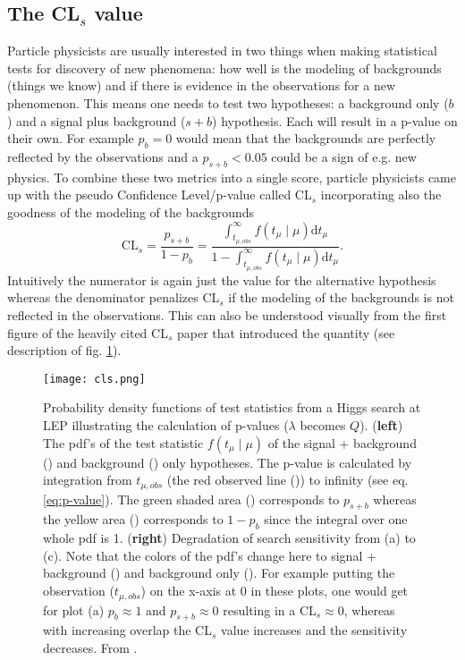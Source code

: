 \subsection{The CL$_s$ value}\label{sec:cls}

Particle physicists are usually interested in two things when making statistical tests for discovery of new phenomena: how well is the modeling of backgrounds (things we know) and if there is evidence in the observations for a new phenomenon. This means one needs to test two hypotheses: a background only ($b$) and a signal plus background ($s+b$) hypothesis. Each will result in a p-value on their own. For example $p_{b}=0$ would mean that the backgrounds are perfectly reflected by the observations and a $p_{s+b} < 0.05$ could be a sign of e.g. new physics. To combine these two metrics into a single score, particle physicists came up with the pseudo Confidence Level/p-value called CL$_s$ incorporating also the goodness of the modeling of the backgrounds 
\begin{equation}
    \mathrm{CL}_s=\frac{p_{s+b}}{1-p_{b}}=
    \frac
    {\int_{t_{\mu ,obs}}^{\infty} 
    f(t_\mu \mid \mu) \mathrm{d}t_\mu}
    {1-\int_{t_{\mu ,obs}}^{\infty} 
    f(t_\mu \mid \mu) \mathrm{d}t_\mu}.
\end{equation}
Intuitively the numerator is again just the value for the alternative hypothesis whereas the denominator penalizes CL$_s$ if the modeling of the backgrounds is not reflected in the observations. This can also be understood visually from the first figure of the heavily cited CL$_s$ paper that introduced the quantity \citep{read2002presentation} (see description of fig. \ref{fig:cls}).
\begin{figure}[H]
    \centering
    \texttt{[image: cls.png]}
        \caption[]{Probability density functions of test statistics from a Higgs search at LEP illustrating the calculation of p-values ($\lambda$ becomes $Q$). (\textbf{left}) The pdf's of the test statistic $f(t_\mu \mid \mu)$ of the signal + background ({\color[HTML]{804000}{$\diagup$}}) and background ({\color[HTML]{2100FF}{$\diagup$}}) only hypotheses. The p-value is calculated by integration from $t_{\mu,obs}$ (the red observed line ({\color[HTML]{FF0000}{$\diagup$}})) to infinity (see eq. \ref{eq:p-value}). The green shaded area () corresponds to $p_{s+b}$ whereas the yellow area () corresponds to $1-p_b$ since the integral over one whole pdf is 1. (\textbf{right}) Degradation of search sensitivity from (a) to (c). Note that the colors of the pdf's change here to signal + background () and background only (). For example putting the observation ($t_{\mu,obs}$) on the x-axis at 0 in these plots, one would get for plot (a) $p_{b}\approx 1$ and $p_{s+b}\approx 0$ resulting in a CL$_s\approx 0$, whereas with increasing overlap the CL$_s$ value increases and the sensitivity decreases.
        From \citep{read2002presentation}.}
    \label{fig:cls}    
\end{figure}



